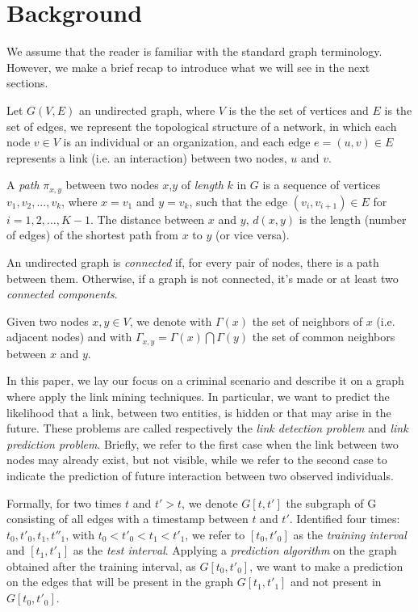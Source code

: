 \section{Background}
\label{sec:background}
We assume that the reader is familiar with the standard graph terminology. However, we make a brief recap to introduce what we will see in the next sections.

Let $G(V,E)$ an undirected graph, where $V$ is the the set of vertices and $E$ is the set of edges, we represent the topological structure of a network, in which each node $v \in V$ is an individual or an organization, and each edge $e=(u,v)\in E$ represents a link (i.e. an interaction) between two nodes, $u$ and $v$. 

A \textit{path} $\pi_{x,y}$ between two nodes $x$,$y$ of \textit{length} $k$ in $G$ is a sequence of vertices $v_{1},v_{2},...,v_{k}$, where $x = v_{1}$ and $y = v_{k}$, such that the edge $(v_{i},v_{i+1}) \in E$ for $i = 1, 2,..., K-1$. The distance between $x$ and $y$, $d(x,y)$ is the length (number of edges) of the shortest path from $x$ to $y$ (or vice versa).

An undirected graph is \textit{connected} if, for every pair of nodes, there is a path between them. Otherwise, if a graph is not connected, it's made or at least two \textit{connected components}.

Given two nodes $x,y \in V$, we denote with $\Gamma(x)$ the set of neighbors of $x$ (i.e. adjacent nodes) and with $\Gamma_{x,y} = \Gamma(x) \bigcap \Gamma(y)$ the set of common neighbors between $x$ and $y$.

In this paper, we lay our focus on a criminal scenario and describe it on a graph where apply the link mining techniques. In particular, we want to predict the likelihood that a link, between two entities, is hidden or that may arise in the future. These problems are called respectively the \textit{link detection problem} and \textit{link prediction problem}. Briefly, we refer to the first case when the link between two nodes may already exist, but not visible, while we refer to the second case to indicate the prediction of future interaction between two observed individuals\cite{Hasan2011}.

Formally, for two times $t$ and $t' > t$, we denote $G[t,t']$ the subgraph of G consisting of all edges with a timestamp between $t$ and $t'$. Identified four times: $t_{0}, t'_{0}, t_{1}, t''_{1}$, with $t_{0}<t'_{0}<t_{1}<t'_{1}$, we refer to $[t_{0},t'_{0}]$ as the \textit{training interval} and $[t_{1},t'_{1}]$ as the \textit{test interval}. Applying a \textit{prediction algorithm} on the graph obtained after the training interval, as $G[t_{0},t'_{0}]$, we want to make a prediction on the edges that will be present in the graph $G[t_{1},t'_{1}]$ and not present in $G[t_{0},t'_{0}]$\cite{Liben-Nowell}.

